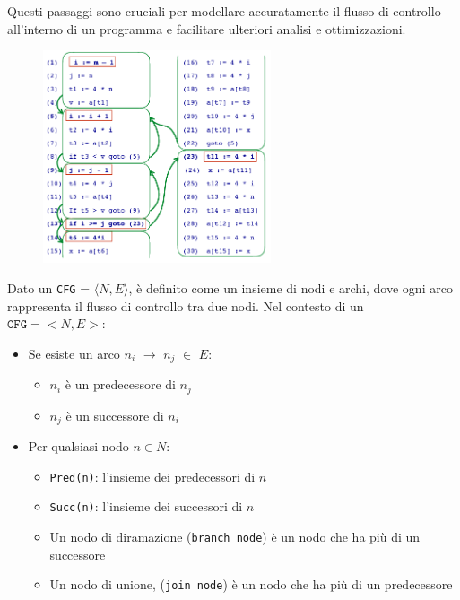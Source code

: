 Questi passaggi sono cruciali per modellare accuratamente il flusso di controllo all'interno
di un programma e facilitare ulteriori analisi e ottimizzazioni.
\begin{figure}[H]
  \centering
  \includegraphics[width=0.6\textwidth]{img/cfg.png}
\end{figure}
Dato un \verb|CFG| = $\langle N, E\rangle$, 
è definito come un insieme di nodi e archi,
dove ogni arco rappresenta il flusso di controllo
tra due nodi. Nel contesto di un $\texttt{CFG} = <N, E>:$
\begin{itemize}
  \item Se esiste un arco $n_i$ $\rightarrow$ $n_j$ $\in$ $E$:
  \begin{itemize}
    \item $n_i$ è un predecessore di $n_j$
    \item $n_j$ è un successore di $n_i$
  \end{itemize}
  \item Per qualsiasi nodo $n \in N$:
  \begin{itemize}
    \item \texttt{Pred(n)}: l'insieme dei predecessori di $n$
    \item \texttt{Succ(n)}: l'insieme dei successori di $n$
    \item Un nodo di diramazione (\texttt{branch node}) è un nodo che ha più di un successore
    \item Un nodo di unione, (\texttt{join node}) è un nodo che ha più di un predecessore
  \end{itemize}
\end{itemize}

